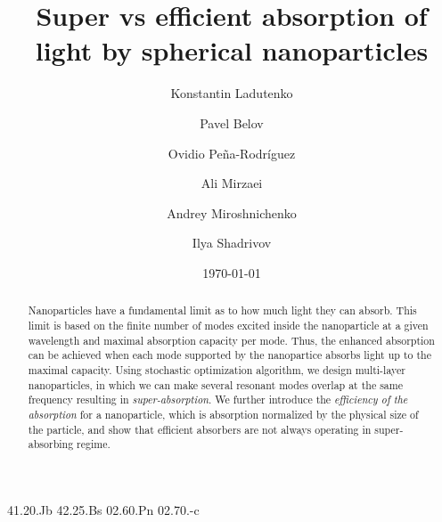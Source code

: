 \documentclass[aps,prl,twocolumn,showpacs,superscriptaddress,groupedaddress]{revtex4-1}
\begin{document}

\title{Super vs efficient absorption of light by spherical
  nanoparticles} %


\author{Konstantin Ladutenko} 


\author{Pavel Belov} 

\author{Ovidio Pe\~{n}a-Rodr\'{i}guez} 

\author{Ali Mirzaei} \author{Andrey Miroshnichenko} \author{Ilya
  Shadrivov} 

\date{\today}

\begin{abstract}
  Nanoparticles have a fundamental limit as to how much light they can
  absorb. This limit is based on the finite number of modes excited
  inside the nanoparticle at a given wavelength and maximal absorption
  capacity per mode. Thus, the enhanced absorption can be achieved
  when each mode supported by the nanopartice absorbs light up to the
  maximal capacity. Using stochastic optimization algorithm, we design multi-layer
  nanoparticles, in which we can make several resonant modes overlap
  at the same frequency resulting in {\it super-absorption}.  We
  further introduce the {\it efficiency of the absorption} for a
  nanoparticle, which is absorption normalized by the physical size of
  the particle, and show that efficient absorbers are not always
  operating in super-absorbing regime.
\end{abstract}


\pacs%
{41.20.Jb 42.25.Bs 02.60.Pn 02.70.-c}
\end{document}
